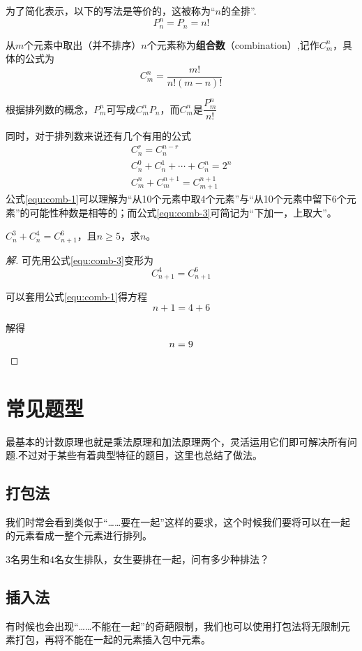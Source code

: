 为了简化表示，以下的写法是等价的，这被称为“$n$的全排”.\[P_n^n=P_n=n!\]

从$m$个元素中取出（并不排序）$n$个元素称为\textbf{组合数}（combination）,记作$C_m^n$，具体的公式为\[C_m^n=\frac{m!}{n!(m-n)!}\]

根据排列数的概念，$P_m^n$可写成$C_m^nP_n$，而$C_m^n$是$\dfrac{P_m^n}{n!}$

同时，对于排列数来说还有几个有用的公式
\begin{gather}
	C_n^r=C_n^{n-r} \label{equ:comb-1} \\
	C_n^0+C_n^1+\cdots+C_n^n=2^n \label{equ:comb-2} \\
	C_m^n+C_m^{n+1}=C_{m+1}^{n+1} \label{equ:comb-3}
\end{gather}
公式\eqref{equ:comb-1}可以理解为“从10个元素中取4个元素”与“从10个元素中留下6个元素”的可能性种数是相等的；而公式\eqref{equ:comb-3}可简记为“下加一，上取大”。

\begin{example}
	$C_n^3+C_n^4=C_{n+1}^6$，且$n\geq5$，求$n$。
\end{example}

\begin{proof}[解]
	可先用公式\eqref{equ:comb-3}变形为\[C_{n+1}^4=C_{n+1}^6\]

	可以套用公式\eqref{equ:comb-1}得方程\[n+1=4+6\]

	解得\[n=9 \qedhere\]
\end{proof}

\section{常见题型}
最基本的计数原理也就是乘法原理和加法原理两个，灵活运用它们即可解决所有问题.不过对于某些有着典型特征的题目，这里也总结了做法。

\subsection{打包法}
我们时常会看到类似于“\ldots\ldots 要在一起”这样的要求，这个时候我们要将可以在一起的元素看成一整个元素进行排列。

\begin{example}
	$3$名男生和$4$名女生排队，女生要排在一起，问有多少种排法？
\end{example}

\subsection{插入法}
有时候也会出现“\ldots\ldots 不能在一起”的奇葩限制，我们也可以使用打包法将无限制元素打包，再将不能在一起的元素插入包中元素。

